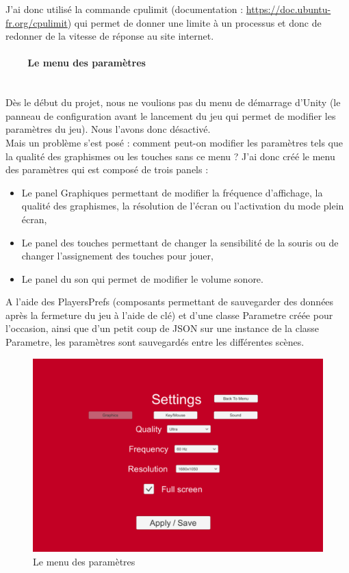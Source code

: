 \documentclass[titlepage, 13px, a4paper]{report}
\begin{document}
J’ai donc utilisé la commande cpulimit (documentation : \url{https://doc.ubuntu-fr.org/cpulimit}) qui permet de donner une 
limite à un processus et donc de redonner de la vitesse de réponse au site internet. \\


\paragraph{~~~~Le menu des paramètres} \hspace{0pt} \\
Dès le début du projet, nous ne voulions pas du menu de démarrage d’Unity (le panneau de configuration avant 
le lancement du jeu qui permet de modifier les paramètres du jeu). Nous l’avons donc désactivé. \\

Mais un problème s’est posé : comment peut-on modifier les paramètres tels que la qualité des graphismes ou les touches sans ce menu ?
J’ai donc créé le menu des paramètres qui est composé de trois panels : \\
{\begin{itemize}
	\item Le panel Graphiques permettant de modifier la fréquence d’affichage, la qualité des graphismes, la résolution 
	de l’écran ou l’activation du mode plein écran,
	\item Le panel des touches permettant de changer la sensibilité de la souris ou de changer l’assignement des touches pour jouer,
	\item Le panel du son qui permet de modifier le volume sonore. \\
\end{itemize}}
A l’aide des PlayersPrefs (composants permettant de sauvegarder des données après la fermeture du jeu à l’aide de clé) 
et d’une classe Parametre créée pour l’occasion, ainsi que d’un petit coup de JSON sur une instance de la classe Parametre, 
les paramètres sont sauvegardés entre les différentes scènes. \\

\begin{figure}[h!]
  \centering
  \includegraphics[scale=0.4]{images/cedric_parametre.png}
  \caption{Le menu des paramètres}
\end{figure}
\end{document}
